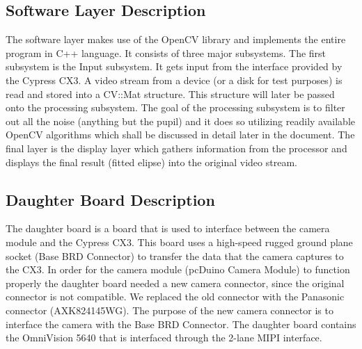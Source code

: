 \subsection{Software Layer Description}
The software layer makes use of the OpenCV library and implements the entire program in C++ language. It consists of three major subsystems. The first subsystem is the Input subsystem. It gets input from the interface provided by the Cypress CX3. A video stream from a device (or a disk for test purposes) is read and stored into a CV::Mat structure. This structure will later be passed onto the processing subsystem.
The goal of the processing subsystem is to filter out all the noise (anything but the pupil) and it does so utilizing readily available OpenCV algorithms which shall be discussed in detail later in the document.
The final layer is the display layer which gathers information from the processor and displays the final result (fitted elipse) into the original video stream. 


\subsection{Daughter Board Description}
The daughter board is a board that is used to interface between the camera module 
and the Cypress CX3. This board uses a high-speed rugged ground plane socket 
(Base BRD Connector) to transfer the data that the camera captures to the CX3. In 
order for the camera module (pcDuino Camera Module) to function properly the 
daughter board needed a new camera connector, since the original connector is not 
compatible. We replaced the old connector with the Panasonic connector 
(AXK824145WG). The purpose of the new camera connector is to interface the 
camera with the Base BRD Connector. The daughter board contains the OmniVision 
5640 that is interfaced through the 2-lane MIPI interface.

